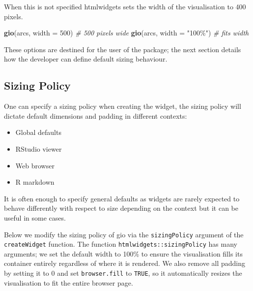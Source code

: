 \documentclass[
]{krantz}
\makeatletter
\newenvironment{Shaded}{\begin{snugshade}}{\end{snugshade}}
\newcommand{\CommentTok}[1]{\textcolor[rgb]{0.37,0.37,0.37}{\textit{#1}}}
\newcommand{\DataTypeTok}[1]{\textcolor[rgb]{0.27,0.27,0.27}{#1}}
\newcommand{\DecValTok}[1]{\textcolor[rgb]{0.06,0.06,0.06}{#1}}
\newcommand{\KeywordTok}[1]{\textcolor[rgb]{0.27,0.27,0.27}{\textbf{#1}}}
\newcommand{\NormalTok}[1]{#1}
\newcommand{\StringTok}[1]{\textcolor[rgb]{0.5,0.5,0.5}{#1}}
\providecommand{\tightlist}{%
  \setlength{\itemsep}{0pt}\setlength{\parskip}{0pt}}
\newenvironment{kframe}{%
\medskip{}
\setlength{\fboxsep}{.8em}
 \def\at@end@of@kframe{}%
 \ifinner\ifhmode%
  \def\at@end@of@kframe{\end{minipage}}%
  \begin{minipage}{\columnwidth}%
 \fi\fi%
 \def\FrameCommand##1{\hskip\@totalleftmargin \hskip-\fboxsep
 \colorbox{shadecolor}{##1}\hskip-\fboxsep
     \hskip-\linewidth \hskip-\@totalleftmargin \hskip\columnwidth}%
 \MakeFramed {\advance\hsize-\width
   \@totalleftmargin\z@ \linewidth\hsize
   \@setminipage}}%
 {\par\unskip\endMakeFramed%
 \at@end@of@kframe}
\renewenvironment{Shaded}{\begin{kframe}}{\end{kframe}}
\makeatother
\begin{document}
When this is not specified htmlwidgets sets the width of the visualisation to 400 pixels.

\begin{Shaded}
\begin{Highlighting}[]
\KeywordTok{gio}\NormalTok{(arcs, }\DataTypeTok{width =} \DecValTok{500}\NormalTok{) }\CommentTok{\# 500 pixels wide}
\KeywordTok{gio}\NormalTok{(arcs, }\DataTypeTok{width =} \StringTok{"100\%"}\NormalTok{) }\CommentTok{\# fits width}
\end{Highlighting}
\end{Shaded}

These options are destined for the user of the package; the next section details how the developer can define default sizing behaviour.

\hypertarget{widgets-adv-sizing-policy}{%
\subsection{Sizing Policy}\label{widgets-adv-sizing-policy}}

One can specify a sizing policy when creating the widget, the sizing policy will dictate default dimensions and padding in different contexts:

\begin{itemize}
\tightlist
\item
  Global defaults
\item
  RStudio viewer
\item
  Web browser
\item
  R markdown
\end{itemize}

It is often enough to specify general defaults as widgets are rarely expected to behave differently with respect to size depending on the context but it can be useful in some cases.

Below we modify the sizing policy of gio via the \texttt{sizingPolicy} argument of the \texttt{createWidget} function. The function \texttt{htmlwidgets::sizingPolicy} has many arguments; we set the default width to 100\% to ensure the visualisation fills its container entirely regardless of where it is rendered. We also remove all padding by setting it to 0 and set \texttt{browser.fill} to \texttt{TRUE}, so it automatically resizes the visualisation to fit the entire browser page.
\end{document}
